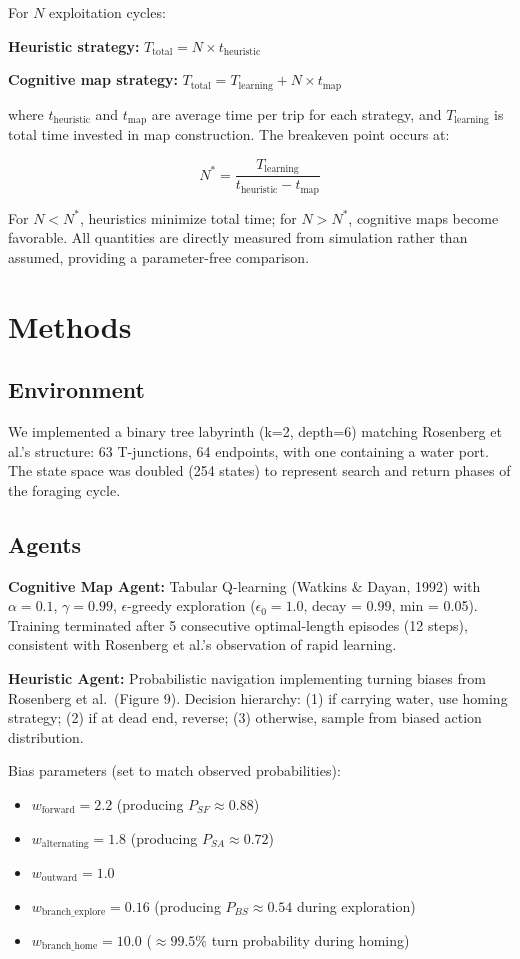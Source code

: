 For $N$ exploitation cycles:

\textbf{Heuristic strategy:} $T_{\text{total}} = N \times t_{\text{heuristic}}$

\textbf{Cognitive map strategy:} $T_{\text{total}} = T_{\text{learning}} + N \times t_{\text{map}}$

where $t_{\text{heuristic}}$ and $t_{\text{map}}$ are average time per trip for each strategy, and $T_{\text{learning}}$ is total time invested in map construction. The breakeven point occurs at:

\[
N^* = \frac{T_{\text{learning}}}{t_{\text{heuristic}} - t_{\text{map}}}
\]

For $N < N^*$, heuristics minimize total time; for $N > N^*$, cognitive maps become favorable. All quantities are directly measured from simulation rather than assumed, providing a parameter-free comparison.

\section{Methods}

\subsection{Environment}

We implemented a binary tree labyrinth (k=2, depth=6) matching Rosenberg et al.'s structure: 63 T-junctions, 64 endpoints, with one containing a water port. The state space was doubled (254 states) to represent search and return phases of the foraging cycle.

\subsection{Agents}

\textbf{Cognitive Map Agent:} Tabular Q-learning (Watkins \& Dayan, 1992) with $\alpha = 0.1$, $\gamma = 0.99$, $\epsilon$-greedy exploration ($\epsilon_0 = 1.0$, decay = 0.99, min = 0.05). Training terminated after 5 consecutive optimal-length episodes (12 steps), consistent with Rosenberg et al.'s observation of rapid learning.

\textbf{Heuristic Agent:} Probabilistic navigation implementing turning biases from Rosenberg et al.\ (Figure 9). Decision hierarchy: (1) if carrying water, use homing strategy; (2) if at dead end, reverse; (3) otherwise, sample from biased action distribution.

Bias parameters (set to match observed probabilities):
\begin{itemize}[noitemsep,topsep=0pt]
    \item $w_{\text{forward}} = 2.2$ (producing $P_{SF} \approx 0.88$)
    \item $w_{\text{alternating}} = 1.8$ (producing $P_{SA} \approx 0.72$)
    \item $w_{\text{outward}} = 1.0$ 
    \item $w_{\text{branch\_explore}} = 0.16$ (producing $P_{BS} \approx 0.54$ during exploration)
    \item $w_{\text{branch\_home}} = 10.0$ ($\approx 99.5\%$ turn probability during homing)
\end{itemize}

